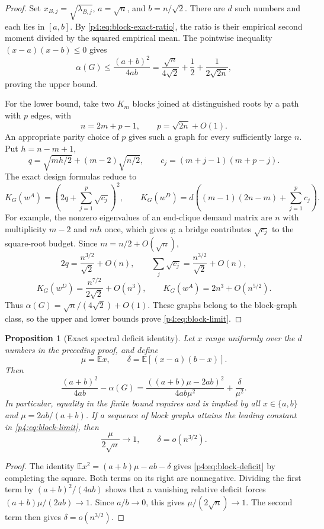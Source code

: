 \documentclass[11pt,a4paper]{article}
\newtheorem{proposition}[theorem]{Proposition}
\theoremstyle{definition}
\theoremstyle{remark}
\numberwithin{equation}{section}
\begin{document}
\begin{proof}
Set $x_{B,j}=\sqrt{\lambda_{B,j}}$, $a=\sqrt n$, and $b=n/\sqrt2$.
There are $d$ such numbers and each lies in $[a,b]$.
By \eqref{p4:eq:block-exact-ratio}, the ratio is their empirical
second moment divided by the squared empirical mean.
The pointwise inequality $(x-a)(x-b)\leq0$ gives
\[
 \alpha(G)\leq\frac{(a+b)^2}{4ab}
 =\frac{\sqrt n}{4\sqrt2}+\frac12+\frac1{2\sqrt{2n}},
\]
proving the upper bound.

For the lower bound, take two $K_m$ blocks joined at distinguished
roots by a path with $p$ edges, with
\[
 n=2m+p-1,\qquad p=\sqrt{2n}+O(1).
\]
An appropriate parity choice of $p$ gives such a graph for every
sufficiently large $n$.
Put $h=n-m+1$,
\[
 q=\sqrt{mh/2}+(m-2)\sqrt{n/2},\qquad
 c_j=(m+j-1)(m+p-j).
\]
The exact design formulas reduce to
\[
 K_G(w^A)=\left(2q+\sum_{j=1}^p\sqrt{c_j}\right)^2,
 \qquad
 K_G(w^D)=d\left((m-1)(2n-m)+\sum_{j=1}^pc_j\right).
\]
For example, the nonzero eigenvalues of an end-clique demand matrix
are $n$ with multiplicity $m-2$ and $mh$ once, which gives $q$;
a bridge contributes $\sqrt{c_j}$ to the square-root budget.
Since $m=n/2+O(\sqrt n)$,
\[
 2q=\frac{n^{3/2}}{\sqrt2}+O(n),\qquad
 \sum_j\sqrt{c_j}=\frac{n^{3/2}}{\sqrt2}+O(n),
\]
\[
 K_G(w^D)=\frac{n^{7/2}}{2\sqrt2}+O(n^3),\qquad
 K_G(w^A)=2n^3+O(n^{5/2}).
\]
Thus $\alpha(G)=\sqrt n/(4\sqrt2)+O(1)$.
These graphs belong to the block-graph class, so the upper and lower
bounds prove \eqref{p4:eq:block-limit}.
\end{proof}

\begin{proposition}[Exact spectral deficit identity]
\label{p4:prop:block-stability}
Let $x$ range uniformly over the $d$ numbers in the preceding proof,
and define
\[
 \mu=\mathbb E x,\qquad
 \delta=\mathbb E[(x-a)(b-x)].
\]
Then
\begin{equation}\label{p4:eq:block-deficit}
 \frac{(a+b)^2}{4ab}-\alpha(G)
 =\frac{((a+b)\mu-2ab)^2}{4ab\mu^2}
  +\frac{\delta}{\mu^2}.
\end{equation}
In particular, equality in the finite bound requires and is implied
by all $x\in\{a,b\}$ and $\mu=2ab/(a+b)$.
If a sequence of block graphs attains the leading constant in
\eqref{p4:eq:block-limit}, then
\[
 \frac{\mu}{2\sqrt n}\longrightarrow1,
 \qquad \delta=o(n^{3/2}).
\]
\end{proposition}

\begin{proof}
The identity
$\mathbb E x^2=(a+b)\mu-ab-\delta$ gives
\eqref{p4:eq:block-deficit} by completing the square.
Both terms on its right are nonnegative.
Dividing the first term by $(a+b)^2/(4ab)$ shows that a vanishing
relative deficit forces $(a+b)\mu/(2ab)\to1$.
Since $a/b\to0$, this gives $\mu/(2\sqrt n)\to1$.
The second term then gives $\delta=o(n^{3/2})$.
\end{proof}
\end{document}
